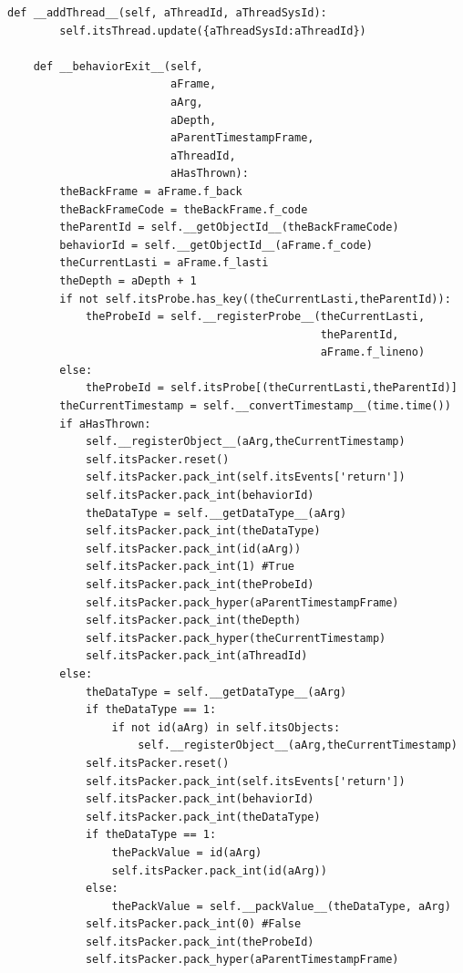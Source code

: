 \documentclass[12pt,legalpaper]{report}
\begin{document}
\begin{singlespace}
\begin{lstlisting}[style=Python]
    def __addThread__(self, aThreadId, aThreadSysId):
        self.itsThread.update({aThreadSysId:aThreadId})
                
    def __behaviorExit__(self,
                         aFrame,
                         aArg,
                         aDepth,
                         aParentTimestampFrame,
                         aThreadId,
                         aHasThrown):
        theBackFrame = aFrame.f_back
        theBackFrameCode = theBackFrame.f_code
        theParentId = self.__getObjectId__(theBackFrameCode)
        behaviorId = self.__getObjectId__(aFrame.f_code)
        theCurrentLasti = aFrame.f_lasti
        theDepth = aDepth + 1
        if not self.itsProbe.has_key((theCurrentLasti,theParentId)):
            theProbeId = self.__registerProbe__(theCurrentLasti,
                                                theParentId,
                                                aFrame.f_lineno)
        else:
            theProbeId = self.itsProbe[(theCurrentLasti,theParentId)]
        theCurrentTimestamp = self.__convertTimestamp__(time.time())
        if aHasThrown:                  
            self.__registerObject__(aArg,theCurrentTimestamp)
            self.itsPacker.reset()
            self.itsPacker.pack_int(self.itsEvents['return'])
            self.itsPacker.pack_int(behaviorId)
            theDataType = self.__getDataType__(aArg)
            self.itsPacker.pack_int(theDataType)
            self.itsPacker.pack_int(id(aArg))
            self.itsPacker.pack_int(1) #True
            self.itsPacker.pack_int(theProbeId)
            self.itsPacker.pack_hyper(aParentTimestampFrame)        
            self.itsPacker.pack_int(theDepth)
            self.itsPacker.pack_hyper(theCurrentTimestamp)
            self.itsPacker.pack_int(aThreadId)
        else:
            theDataType = self.__getDataType__(aArg)
            if theDataType == 1:
                if not id(aArg) in self.itsObjects:
                    self.__registerObject__(aArg,theCurrentTimestamp)
            self.itsPacker.reset()
            self.itsPacker.pack_int(self.itsEvents['return'])
            self.itsPacker.pack_int(behaviorId)
            self.itsPacker.pack_int(theDataType)
            if theDataType == 1:
                thePackValue = id(aArg)
                self.itsPacker.pack_int(id(aArg))
            else:
                thePackValue = self.__packValue__(theDataType, aArg)            
            self.itsPacker.pack_int(0) #False
            self.itsPacker.pack_int(theProbeId)
            self.itsPacker.pack_hyper(aParentTimestampFrame)        

\end{lstlisting}
\end{singlespace}
\end{document}
